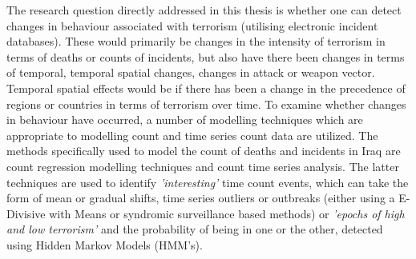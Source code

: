 The research question directly addressed in this thesis is whether one can detect changes in behaviour associated with terrorism (utilising electronic incident databases). These would primarily be changes in the intensity of terrorism in terms of deaths or counts of incidents, but also have there been changes in terms of temporal, temporal spatial changes, changes in attack or weapon vector. Temporal spatial effects would be if there has been a change in the precedence of regions or countries in terms of terrorism over time. To examine whether changes in behaviour have occurred, a number of modelling techniques which are appropriate to modelling count and time series count data are utilized. The methods specifically used to model the count of deaths and incidents in Iraq are count regression modelling techniques and count time series analysis. The latter techniques are used to identify \textit{'interesting'} time count events, which can take the form of mean or gradual shifts, time series outliers or outbreaks (either using a E-Divisive with Means or syndromic surveillance based methods) or \textit{'epochs of high and low terrorism'} and the probability of being in one or the other, detected using Hidden Markov Models (HMM's).      

